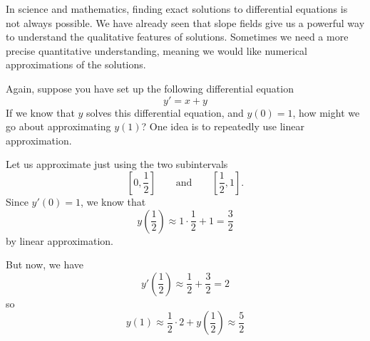 \documentclass{ximera}
\begin{document}
In science and mathematics, finding exact solutions to differential
equations is not always possible.  We have already seen that slope
fields give us a powerful way to understand the qualitative features
of solutions.  Sometimes we need a more precise quantitative
understanding, meaning we would like numerical approximations of the
solutions.


Again, suppose you have set up the following differential equation
\[
y' = x+y
\]
If we know that $y$ solves this differential equation, and $y(0) = 1$,
how might we go about approximating $y(1)$?  One idea is to repeatedly
use linear approximation.

Let us approximate just using the two subintervals
\[
\left[0,\frac{1}{2}\right]\qquad\text{and}\qquad \left[\frac{1}{2},1\right].
\]
Since $y'(0) = 1$, we know that
\[
y\left(\frac{1}{2}\right)\approx 1 \cdot \frac{1}{2} + 1 = \frac{3}{2}
\]
by linear approximation.
\begin{image}
\end{image}
But now, we have
\[
y'\left(\frac{1}{2}\right) \approx \frac{1}{2}+\frac{3}{2} = 2
\]
so
\[
y(1) \approx  \frac{1}{2} \cdot 2 + y\left(\frac{1}{2}\right)\approx \frac{5}{2}
\]
\begin{image}
\end{image}
\end{document}
